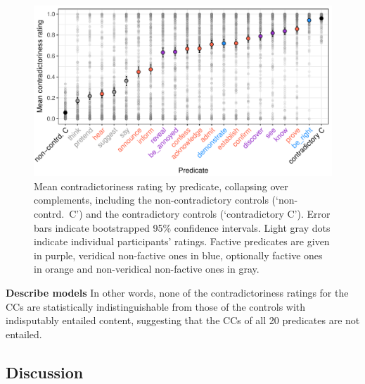 \documentclass[11pt,fleqn]{article}
\newcommand{\6}{\mbox{$[\hspace*{-.6mm}[$}}
\newcommand{\9}{\mbox{$]\hspace*{-.6mm}]$}}
\begin{document}
{%

\begin{figure}[h!]
\centering

\includegraphics[width=.7\paperwidth]{../results/2-veridicality2/graphs/means-contradictoriness-by-predicate-variability}

\caption{Mean contradictoriness rating by predicate, collapsing over complements, including the non-contradictory controls (`non-contrd.\ C') and the contradictory controls (`contradictory C'). Error bars indicate bootstrapped 95\% confidence intervals. Light gray dots indicate individual participants' ratings. Factive predicates are given in purple, veridical non-factive ones in blue, optionally factive ones in orange and non-veridical non-factive ones in gray.}
\label{f-veridicality-predicate2}
\end{figure}

{\bf Describe models} In other words, none of the contradictoriness ratings for the CCs are statistically indistinguishable from those of the controls with indisputably entailed content, suggesting that the CCs of all 20 predicates are not entailed.

\subsection{Discussion}\label{s33}

}
\end{document}

